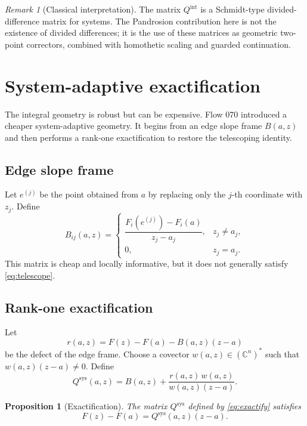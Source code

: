 \documentclass[11pt,a4paper]{article}
\theoremstyle{definition}
\theoremstyle{plain}
\newtheorem{proposition}[definition]{Proposition}
\theoremstyle{remark}
\newtheorem{remark}[definition]{Remark}
\newcommand{\C}{\mathbb C}
\begin{document}
\begin{remark}[Classical interpretation]
The matrix \(Q^{\mathrm{int}}\) is a Schmidt-type divided-difference matrix for
systems.  The Pandrosion contribution here is not the existence of divided
differences; it is the use of these matrices as geometric two-point correctors,
combined with homothetic scaling and guarded continuation.
\end{remark}

\section{System-adaptive exactification}

The integral geometry is robust but can be expensive.  Flow 070 introduced a
cheaper system-adaptive geometry.  It begins from an edge slope frame \(B(a,z)\)
and then performs a rank-one exactification to restore the telescoping identity.

\subsection{Edge slope frame}

Let \(e^{(j)}\) be the point obtained from \(a\) by replacing only the
\(j\)-th coordinate with \(z_j\).  Define
\[
  B_{ij}(a,z)
  =
  \begin{cases}
  \dfrac{F_i(e^{(j)})-F_i(a)}{z_j-a_j},
  & z_j\ne a_j,\\[1.2em]
  0,& z_j=a_j.
  \end{cases}
\]
This matrix is cheap and locally informative, but it does not generally satisfy
\eqref{eq:telescope}.

\subsection{Rank-one exactification}

Let
\[
  r(a,z)=F(z)-F(a)-B(a,z)(z-a)
\]
be the defect of the edge frame.  Choose a covector \(w(a,z)\in(\C^n)^*\) such
that \(w(a,z)(z-a)\ne0\).  Define
\begin{equation}
  \label{eq:exactify}
  Q^{\mathrm{sys}}(a,z)
  =
  B(a,z)
  +
  \frac{r(a,z)\,w(a,z)}{w(a,z)(z-a)}.
\end{equation}

\begin{proposition}[Exactification]
\label{prop:exactify}
The matrix \(Q^{\mathrm{sys}}\) defined by \eqref{eq:exactify} satisfies
\[
  F(z)-F(a)=Q^{\mathrm{sys}}(a,z)(z-a).
\]
\end{proposition}
\end{document}
